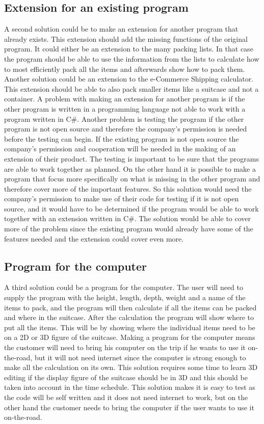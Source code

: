 \subsection{Extension for an existing program}
A second solution could be to make an extension for another program that already exists. This extension should add the missing functions of the original program. It could either be an extension to the many packing lists. In that case the program should be able to use the information from the lists to calculate how to most efficiently pack all the items and afterwards show how to pack them. Another solution could be an extension to the e-Commerce Shipping calculator. This extension should be able to also pack smaller items like a suitcase and not a container. A problem with making an extension for another program is if the other program is written in a programming language not able to work with a program written in C\#. Another problem is testing the program if the other program is not open source and therefore the company's permission is needed before the testing can begin. If the existing program is not open source the company's permission and cooperation will be needed in the making of an extension of their product. The testing is important to be sure that the programs are able to work together as planned. On the other hand it is possible to make a program that focus more specifically on what is missing in the other program and therefore cover more of the important features. So this solution would need the company's permission to make use of their code for testing if it is not open source, and it would have to be determined if the program would be able to work together with an extension written in C\#. The solution would be able to cover more of the problem since the existing program would already have some of the features needed and the extension could cover even more.
\newline
\subsection{Program for the computer}
A third solution could be a program for the computer. The user will need to supply the program with the height, length, depth, weight and a name of the items to pack, and the program will then calculate if all the items can be packed and where in the suitcase. After the calculation the program will show where to put all the items. This will be by showing where the individual items need to be on a 2D or 3D figure of the suitcase. Making a program for the computer means the customer will need to bring his computer on the trip if he wants to use it on-the-road, but it will not need internet since the computer is strong enough to make all the calculation on its own. This solution requires some time to learn 3D editing if the display figure of the suitcase should be in 3D and this should be taken into account in the time schedule.  This solution makes it is easy to test as the code will be self written and it does not need internet to work, but on the other hand the customer needs to bring the computer if the user wants to use it on-the-road.
\newline
